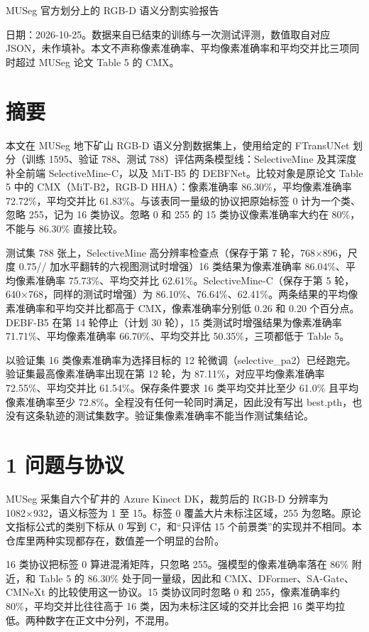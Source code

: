 \documentclass[11pt]{article}
\begin{document}
{\centering\LARGE MUSeg 官方划分上的 RGB-D 语义分割实验报告\par}
\vspace{0.8em}
日期：2026-10-25。数据来自已结束的训练与一次测试评测，数值取自对应 JSON，未作填补。本文不声称像素准确率、平均像素准确率和平均交并比三项同时超过 MUSeg 论文 Table 5 的 CMX。

\section*{摘要}
本文在 MUSeg 地下矿山 RGB-D 语义分割数据集上，使用给定的 FTransUNet 划分（训练 1595、验证 788、测试 788）评估两条模型线：SelectiveMine 及其深度补全前端 SelectiveMine-C，以及 MiT-B5 的 DEBFNet。比较对象是原论文 Table 5 中的 CMX（MiT-B2，RGB-D HHA）：像素准确率 86.30\%，平均像素准确率 72.72\%，平均交并比 61.83\%。与该表同一量级的协议把原始标签 0 计为一个类、忽略 255，记为 16 类协议。忽略 0 和 255 的 15 类协议像素准确率大约在 80\%，不能与 86.30\% 直接比较。

测试集 788 张上，SelectiveMine 高分辨率检查点（保存于第 7 轮，768×896，尺度 0.75// 加水平翻转的六视图测试时增强）16 类结果为像素准确率 86.04\%、平均像素准确率 75.73\%、平均交并比 62.61\%。SelectiveMine-C（保存于第 5 轮，640×768，同样的测试时增强）为 86.10\%、76.64\%、62.41\%。两条结果的平均像素准确率和平均交并比都高于 CMX，像素准确率分别低 0.26 和 0.20 个百分点。DEBF-B5 在第 14 轮停止（计划 30 轮），15 类测试时增强结果为像素准确率 71.71\%、平均像素准确率 66.70\%、平均交并比 50.35\%，三项都低于 Table 5。

以验证集 16 类像素准确率为选择目标的 12 轮微调（selective\_\allowbreak pa2）已经跑完。验证集最高像素准确率出现在第 12 轮，为 87.11\%，对应平均像素准确率 72.55\%、平均交并比 61.54\%。保存条件要求 16 类平均交并比至少 61.0\% 且平均像素准确率至少 72.8\%。全程没有任何一轮同时满足，因此没有写出 best.pth，也没有这条轨迹的测试集数字。验证集像素准确率不能当作测试集结论。

\section*{1 问题与协议}
MUSeg 采集自六个矿井的 Azure Kinect DK，裁剪后的 RGB-D 分辨率为 1082×932，语义标签为 1 至 15。标签 0 覆盖大片未标注区域，255 为忽略。原论文指标公式的类别下标从 0 写到 C，和“只评估 15 个前景类”的实现并不相同。本仓库里两种实现都存在，数值差一个明显的台阶。

16 类协议把标签 0 算进混淆矩阵，只忽略 255。强模型的像素准确率落在 86\% 附近，和 Table 5 的 86.30\% 处于同一量级，因此和 CMX、DFormer、SA-Gate、CMNeXt 的比较使用这一协议。15 类协议同时忽略 0 和 255，像素准确率约 80\%，平均交并比往往高于 16 类，因为未标注区域的交并比会把 16 类平均拉低。两种数字在正文中分列，不混用。
\end{document}
